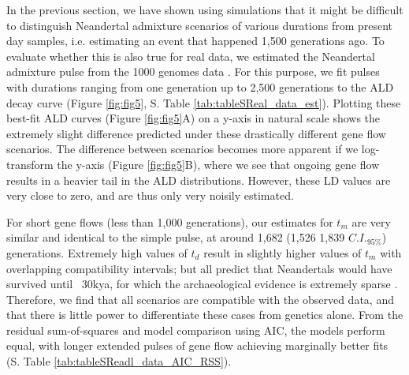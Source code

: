 \documentclass[11pt]{article}
\begin{document}
In the previous section, we have shown using simulations that it might be difficult to distinguish Neandertal admixture scenarios of various durations from present day samples, i.e. estimating an event that happened 1,500 generations ago. To evaluate whether this is also true for real data, we estimated the Neandertal admixture pulse from the 1000 genomes data \cite{the_1000_genomes_project_consortium_global_2015}. For this purpose,  we fit  pulses with durations ranging from one generation up to 2,500 generations to the ALD decay curve (Figure \ref{fig:fig5}, S. Table \ref{tab:tableSReal_data_est}). Plotting these best-fit ALD curves (Figure \ref{fig:fig5}A) on a y-axis in natural scale shows the extremely slight difference predicted under these drastically different gene flow scenarios. The difference between scenarios becomes more apparent if we log-transform the y-axis (Figure \ref{fig:fig5}B), where we see that ongoing gene flow results in a heavier tail in the ALD distributions. However, these LD values are very close to zero, and are thus only very noisily estimated. 

For short gene flows (less than 1,000 generations), our estimates for $t_m$ are very similar and identical to the simple pulse, at around 1,682 (1,526 1,839 $C.I._{95\%}$) generations. Extremely high values of $t_d$ result in slightly higher values of $t_m$ with overlapping compatibility intervals; but all predict that Neandertals would have survived until ~30kya, for which the archaeological evidence is extremely sparse \cite{SOMETHING}.  Therefore, we find that all scenarios are compatible with the observed data, and that there is little power to differentiate these cases from genetics alone. From the residual sum-of-squares and model comparison using AIC, the models perform equal, with longer extended pulses of gene flow achieving marginally better fits (S. Table \ref{tab:tableSReadl_data_AIC_RSS}). 
\end{document}

